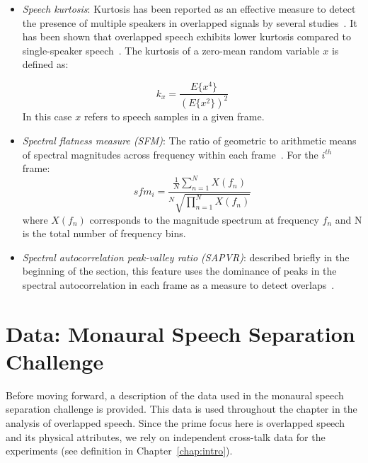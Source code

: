 \begin{itemize}
	\item {\it Speech kurtosis}: Kurtosis has been reported as an effective measure to detect the presence of multiple speakers in overlapped signals by several studies~\cite{Wrigley_05,boakye_thesis,temple_kurtosis}. 
	It has been shown that overlapped speech exhibits lower kurtosis compared to single-speaker speech~\cite{leblanc_deleon98}. The kurtosis of a zero-mean random variable $x$ is defined as:
	
	\begin{equation}
	\label{eq:kurtosis}
	k_x = \frac{E\{x^4\}}{(E\{x^2\})^2}
	\end{equation}
	\vspace{1mm}
	In this case $x$ refers to speech samples in a given frame. 
	\item {\it Spectral flatness measure (SFM)}: The ratio of geometric to arithmetic means of spectral magnitudes across frequency within each frame~\cite{nav_icassp13}. For the $i^{th}$ frame:
	\begin{equation}
	\label{eq:kurtosis}
	sfm_i = \frac{\frac{1}{N}\sum_{n=1}^{N}{X(f_n)}}{^N\sqrt{\prod_{n=1}^{N}{X(f_n)}}}
	\end{equation}
	\vspace{1mm}
	where $X(f_n)$ corresponds to the magnitude spectrum at frequency $f_n$ and {N} is the total number of frequency bins. 
	\item {\it Spectral autocorrelation peak-valley ratio (SAPVR)}: described briefly in the beginning of the section, this feature uses the dominance of peaks in the spectral autocorrelation in each frame as a measure to detect overlaps~\cite{sapvr_2000}. 
\end{itemize}

\newpage
\section{Data: Monaural Speech Separation Challenge}
\label{sec:data}
Before moving forward, a description of the data used in the monaural speech separation challenge is provided. 
This data is used throughout the chapter in the analysis of overlapped speech. 
Since the prime focus here is overlapped speech and its physical attributes, we rely on independent cross-talk data for the experiments (see definition in Chapter~\ref{chap:intro}). 

